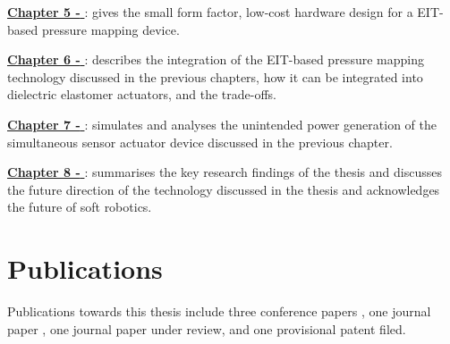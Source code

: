 \hyperref[chapter5]{\textbf{Chapter 5 - \chapvname}}: gives the small form factor, low-cost hardware design for a EIT-based pressure mapping device.

\hyperref[chapter6]{\textbf{Chapter 6 - \chapviname}}: describes the integration of the EIT-based pressure mapping technology discussed in the previous chapters, how it can be integrated into dielectric elastomer actuators, and the trade-offs.

\hyperref[chapter7]{\textbf{Chapter 7 - \chapviiname}}: simulates and analyses the unintended power generation of the simultaneous sensor actuator device discussed in the previous chapter.

\hyperref[chapter8]{\textbf{Chapter 8 - \chapviiiname}}: summarises the key research findings of the thesis and discusses the future direction of the technology discussed in the thesis and acknowledges the future of soft robotics.

\section{Publications}
Publications towards this thesis include three conference papers \cite{Ellingham2021,Ellingham2022,Ellingham2024a}, one journal paper \cite{Ellingham2024}, one journal paper under review, and one provisional patent filed. 

\cleardoublepage